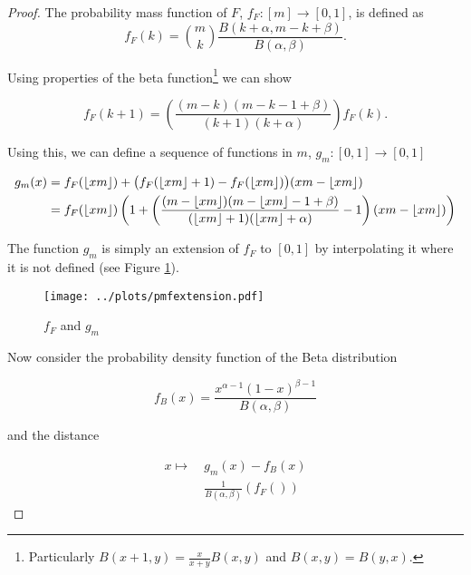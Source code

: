 \documentclass[american, abstract=on]{scrartcl}
\theoremstyle{plain}
\DeclarePairedDelimiter{\floor}{\lfloor}{\rfloor}
\begin{document}
\begin{proof}
    The probability mass function of $F$, $f_F: [m] \to [0, 1]$, is defined as
    \begin{equation}
        f_F(k) = \binom{m}{k} \frac{B(k + \alpha, m - k + \beta)}{B(\alpha, \beta)}.
    \end{equation}

    Using properties of the beta function\footnote{Particularly $B(x + 1, y) = \frac{x}{x + y} B(x, y)$ and $B(x, y) = B(y, x)$.} we can show

    \begin{equation}
        f_F(k+1) = \left(\frac{(m - k)(m-k-1 + \beta)}{(k + 1)(k + \alpha)}\right) f_F(k).
    \end{equation}

    Using this, we can define a sequence of functions in $m$, $g_m: [0, 1] \to [0, 1]$

    \begin{equation}
        \begin{split}
            g_m(x) &= f_F(\floor{xm}) + \big(f_F(\floor{xm} + 1) - f_F(\floor{xm})\big)  (xm - \floor{xm}) \\
            &= f_F(\floor{xm}) \left(1 + \left(\frac{(m - \floor{xm})(m-\floor{xm}-1 + \beta)}{(\floor{xm} + 1)(\floor{xm} + \alpha)} - 1 \right) (xm - \floor{xm})\right)
        \end{split}
    \end{equation}

    The function $g_m$ is simply an extension of $f_F$ to $[0, 1]$ by interpolating it where it is not defined (see Figure \ref{fig:pmfextension}).

    \begin{figure}[H]
        \centering
        \texttt{[image: ../plots/pmfextension.pdf]}
        \caption{$f_F$ and $g_m$}
        \label{fig:pmfextension}
    \end{figure}

    Now consider the probability density function of the Beta distribution 

    \begin{equation}
        f_B(x) = \frac{x^{\alpha - 1} (1 - x)^{\beta - 1}}{B(\alpha, \beta)}
    \end{equation}

    and the distance 

    \begin{equation}
        \begin{split}
            x \mapsto \ &g_m(x) - f_B(x) \\
            &\frac{1}{B(\alpha, \beta)} \left( f_F() \right)
        \end{split}
    \end{equation}

\end{proof}
\end{document}
